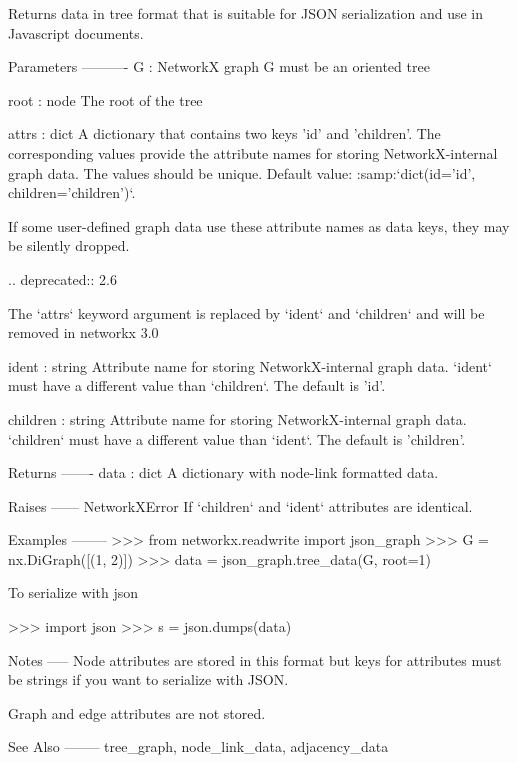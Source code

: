 \begin{DoxyVerb}Returns data in tree format that is suitable for JSON serialization
and use in Javascript documents.

Parameters
----------
G : NetworkX graph
   G must be an oriented tree

root : node
   The root of the tree

attrs : dict
    A dictionary that contains two keys 'id' and 'children'. The
    corresponding values provide the attribute names for storing
    NetworkX-internal graph data. The values should be unique. Default
    value: :samp:`dict(id='id', children='children')`.

    If some user-defined graph data use these attribute names as data keys,
    they may be silently dropped.

    .. deprecated:: 2.6

       The `attrs` keyword argument is replaced by `ident` and `children`
       and will be removed in networkx 3.0

ident : string
    Attribute name for storing NetworkX-internal graph data. `ident` must
    have a different value than `children`. The default is 'id'.

children : string
    Attribute name for storing NetworkX-internal graph data. `children`
    must have a different value than `ident`. The default is 'children'.

Returns
-------
data : dict
   A dictionary with node-link formatted data.

Raises
------
NetworkXError
    If `children` and `ident` attributes are identical.

Examples
--------
>>> from networkx.readwrite import json_graph
>>> G = nx.DiGraph([(1, 2)])
>>> data = json_graph.tree_data(G, root=1)

To serialize with json

>>> import json
>>> s = json.dumps(data)

Notes
-----
Node attributes are stored in this format but keys
for attributes must be strings if you want to serialize with JSON.

Graph and edge attributes are not stored.

See Also
--------
tree_graph, node_link_data, adjacency_data
\end{DoxyVerb}
 \mbox{\label{namespacenetworkx_1_1readwrite_1_1json__graph_1_1tree_aef119a559fb1947b2d159beabb83001e}} 
